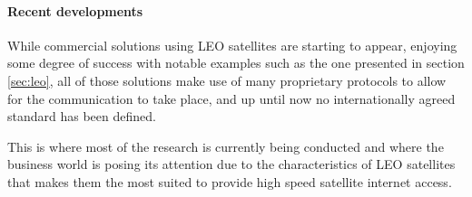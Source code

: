 \paragraph{Recent developments}
While commercial solutions using \ac{LEO} satellites are starting to appear, enjoying some degree of success with notable examples such as the one presented in section \ref{sec:leo}, all of those solutions make use of many proprietary protocols to allow for the communication to take place, and up until now no internationally agreed standard has been defined.

This is where most of the research is currently being conducted and where the business world is posing its attention due to the characteristics of \ac{LEO} satellites that makes them the most suited to provide high speed satellite internet access.
